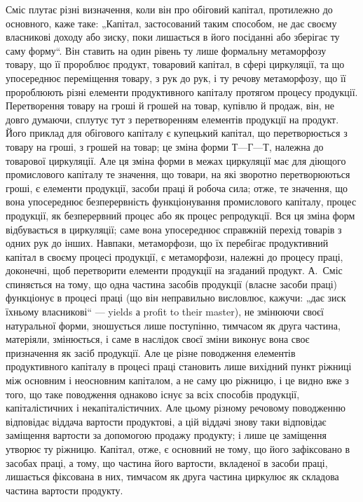 Сміс плутає різні визначення, коли він про обіговий капітал, протилежно
до основного, каже таке: „Капітал, застосований таким способом,
не дає своєму власникові доходу або зиску, поки лишається в його посіданні
або зберігає ту саму форму“. Він ставить на один рівень ту лише
формальну метаморфозу товару, що її пророблює продукт, товаровий
капітал, в сфері циркуляції, та що упосереднює переміщення товару,
з рук до рук, і ту речову метаморфозу, що її пророблюють різні елементи
продуктивного капіталу протягом процесу продукції. Перетворення
товару на гроші й грошей на товар, купівлю й продаж, він, не довго
думаючи, сплутує тут з перетворенням елементів продукції на продукт.
Його приклад для обігового капіталу є купецький капітал, що перетворюється
з товару на гроші, з грошей на товар; це зміна форми $Т — Г — Т$,
належна до товарової циркуляції. Але ця зміна форми в межах циркуляції
має для діющого промислового капіталу те значення, що товари, на
які зворотно перетворюються гроші, є елементи продукції, засоби праці
й робоча сила; отже, те значення, що вона упосереднює безперервність
функціонування промислового капіталу, процес продукції, як безперервний
процес або як процес репродукції. Вся ця зміна форм відбувається
в циркуляції; саме вона упосереднює справжній перехід товарів з
одних рук до інших. Навпаки, метаморфози, що їх перебігає продуктивний
капітал в своєму процесі продукції, є метаморфози, належні до
процесу праці, доконечні, щоб перетворити елементи продукції на
згаданий продукт. А.~Сміс спиняється на тому, що одна частина засобів
продукції (власне засоби праці) функціонує в процесі праці (що він
неправильно висловлює, кажучи: „дає зиск їхньому власникові“ — yields а
profit to their master), не змінюючи своєї натуральної форми, зношується
лише поступінно, тимчасом як друга частина, матеріяли, змінюється, і
саме в наслідок своєї зміни виконує вона своє призначення як засіб продукції.
Але це різне поводження елементів продуктивного капіталу в
процесі праці становить лише вихідний пункт ріжниці між основним і неосновним
капіталом, а не саму цю ріжницю, і це видно вже з того, що
таке поводження однаково існує за всіх способів продукції, капіталістичних
і некапіталістичних. Але цьому різному речовому поводженню відповідає
віддача вартости продуктові, а цій віддачі знову таки відповідає
заміщення вартости за допомогою продажу продукту; і лише це
заміщення утворює ту ріжницю. Капітал, отже, є основний не тому, що
його зафіксовано в засобах праці, а тому, що частина його вартости,
вкладеної в засоби праці, лишається фіксована в них, тимчасом як друга
частина циркулює як складова частина вартости продукту.


